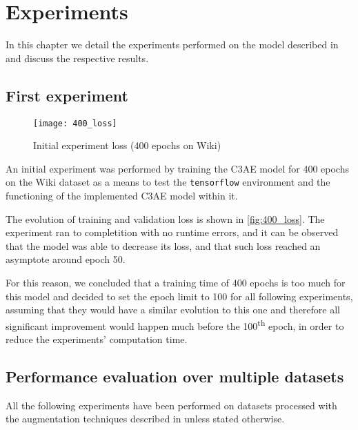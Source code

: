 
\chapter{Experiments}
\label{chp:experiments}
In this chapter we detail the experiments performed on the model described in
 and discuss the respective results.

\section{First experiment}
\label{subsec:first}

\begin{wrapfigure}[15]{r}{0.5\textwidth}
    \centering
    \vspace{-20pt}
    \texttt{[image: 400\_loss]}
    \caption{Initial experiment loss (400 epochs on Wiki)}
    \label{fig:400_loss}
\end{wrapfigure}

An initial experiment was performed by training the C3AE model for
400 epochs on the Wiki dataset as a means to test the \texttt{tensorflow} environment
and the functioning of the implemented C3AE model within it.

The evolution of training and validation loss is shown in \autoref{fig:400_loss}.
The experiment ran to completition with no runtime errors, and
it can be observed that the model was able to decrease its loss,
and that such loss reached an asymptote around epoch 50.

For this reason, we concluded that a training time of 400 epochs
is too much for this model and decided to set the epoch limit to 100 for
all following experiments, assuming that they would have a similar
evolution to this one and therefore all significant improvement
would happen much before the 100\textsuperscript{th} epoch,
in order to reduce the experiments' computation time.

\section{Performance evaluation over multiple datasets}

All the following experiments have been performed on datasets processed with the 
augmentation techniques described in  unless stated otherwise.

